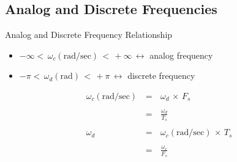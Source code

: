 \documentclass{beamer}
\begin{document}
\subsection{Analog and Discrete Frequencies}
\begin{frame}[t,allowframebreaks]{Analog and Discrete Frequency Relationship}

\begin{itemize}

\item $ -\infty < \, \omega_c \left(\text{rad/sec}\right) \, < \, + \infty \, \leftrightarrow$ analog frequency

\item $ - \pi < \, \omega_d \left(\text{rad}\right) \, < \, + \pi \, \leftrightarrow$ discrete frequency

\end{itemize}

\begin{equation}
\begin{array}{rcl}
\omega_c \left(\text{rad/sec}\right) \, &=& \, \omega_d \, \times \, F_s \\ \\
&=& \, \displaystyle\frac{\omega_d}{T_s}  \\ \\

\omega_d \, &=& \, \omega_c \left(\text{rad/sec}\right) \, \times \, T_s \\ \\
&=& \, \displaystyle\frac{\omega_c}{F_s}
\end{array}
\label{Eq:Freq_relation:analog_discrete_freq}
\end{equation}



\end{frame}
\end{document}
